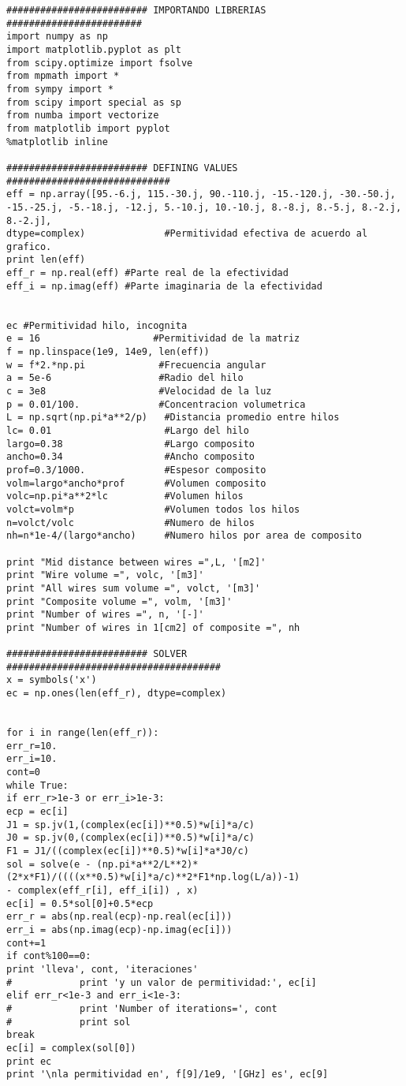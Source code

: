 \documentclass[12pt,letterpaper]{article}
\numberwithin{equation}{section}
\begin{document}
\begin{lstlisting}
######################### IMPORTANDO LIBRERIAS ########################
import numpy as np
import matplotlib.pyplot as plt
from scipy.optimize import fsolve
from mpmath import *
from sympy import *
from scipy import special as sp
from numba import vectorize
from matplotlib import pyplot
%matplotlib inline

######################### DEFINING VALUES #############################
eff = np.array([95.-6.j, 115.-30.j, 90.-110.j, -15.-120.j, -30.-50.j, -15.-25.j, -5.-18.j, -12.j, 5.-10.j, 10.-10.j, 8.-8.j, 8.-5.j, 8.-2.j, 8.-2.j],
dtype=complex)              #Permitividad efectiva de acuerdo al grafico.
print len(eff)
eff_r = np.real(eff) #Parte real de la efectividad
eff_i = np.imag(eff) #Parte imaginaria de la efectividad


ec #Permitividad hilo, incognita
e = 16                    #Permitividad de la matriz
f = np.linspace(1e9, 14e9, len(eff))
w = f*2.*np.pi             #Frecuencia angular
a = 5e-6                   #Radio del hilo
c = 3e8                    #Velocidad de la luz
p = 0.01/100.              #Concentracion volumetrica
L = np.sqrt(np.pi*a**2/p)   #Distancia promedio entre hilos
lc= 0.01                    #Largo del hilo
largo=0.38                  #Largo composito
ancho=0.34                  #Ancho composito
prof=0.3/1000.              #Espesor composito
volm=largo*ancho*prof       #Volumen composito
volc=np.pi*a**2*lc          #Volumen hilos
volct=volm*p                #Volumen todos los hilos
n=volct/volc                #Numero de hilos
nh=n*1e-4/(largo*ancho)     #Numero hilos por area de composito

print "Mid distance between wires =",L, '[m2]'
print "Wire volume =", volc, '[m3]'
print "All wires sum volume =", volct, '[m3]'
print "Composite volume =", volm, '[m3]'
print "Number of wires =", n, '[-]'
print "Number of wires in 1[cm2] of composite =", nh

######################### SOLVER ######################################
x = symbols('x')
ec = np.ones(len(eff_r), dtype=complex)


for i in range(len(eff_r)):
err_r=10.
err_i=10.
cont=0
while True:
if err_r>1e-3 or err_i>1e-3:
ecp = ec[i]
J1 = sp.jv(1,(complex(ec[i])**0.5)*w[i]*a/c)
J0 = sp.jv(0,(complex(ec[i])**0.5)*w[i]*a/c)
F1 = J1/((complex(ec[i])**0.5)*w[i]*a*J0/c)
sol = solve(e - (np.pi*a**2/L**2)*(2*x*F1)/((((x**0.5)*w[i]*a/c)**2*F1*np.log(L/a))-1)
- complex(eff_r[i], eff_i[i]) , x)
ec[i] = 0.5*sol[0]+0.5*ecp
err_r = abs(np.real(ecp)-np.real(ec[i]))
err_i = abs(np.imag(ecp)-np.imag(ec[i]))
cont+=1
if cont%100==0:
print 'lleva', cont, 'iteraciones'
#            print 'y un valor de permitividad:', ec[i]
elif err_r<1e-3 and err_i<1e-3:
#            print 'Number of iterations=', cont
#            print sol
break
ec[i] = complex(sol[0])
print ec
print '\nla permitividad en', f[9]/1e9, '[GHz] es', ec[9] 

\end{lstlisting}
\end{document}
